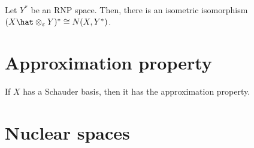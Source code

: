 \documentclass{../../small}
\begin{document}
\begin{prb}
Let $Y^*$ be an RNP space.
Then, there is an isometric isomorphism $(X\hat\otimes_\e Y)^*\cong N(X,Y^*)$.
\end{prb}

\section{Approximation property}

\begin{prb}
\end{prb}

\begin{prb}
\end{prb}

\begin{prb}
\end{prb}

\begin{prb}
\begin{parts}
\item If $X$ has a Schauder basis, then it has the approximation property.
\end{parts}
\end{prb}



\section{Nuclear spaces}
\end{document}
